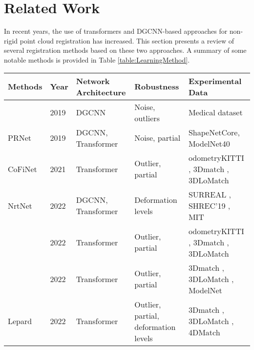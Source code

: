 \section{Related Work}
\label{RelatedWork}
In recent years, the use of transformers and DGCNN-based approaches for non-rigid point cloud registration has increased. This section presents a review of several registration methods based on these two approaches. A summary of some notable methods is provided in Table \ref{table:LearningMethod}.


\begin{table*}
\footnotesize
\centering
\caption{Overview of some learning-based non-rigid point cloud registration methods based on Transformers and DGCNN}
\label{table:LearningMethod}
\begin{tabular}{p{2.25cm} p{1cm} p{2.5cm} p{4cm} p{6cm}} 
\hline
Methods&Year& \raggedright Network Architecture & Robustness & Experimental Data \\
\hline

\citep{hansen2019learning}&2019& DGCNN & Noise, outliers & Medical dataset \\
\hline


PRNet \citep{wang2019prnet}&2019 & \raggedright DGCNN, Transformer  & Noise, partial & ShapeNetCore\citep{chang2015shapenet}, ModelNet40 \citep{wu20153d}  \\
\hline

CoFiNet \cite{yu2021cofinet}&2021& Transformer& Outlier, partial & odometryKITTI \cite{geiger2013vision}, 3Dmatch \cite{zeng20173dmatch}, 3DLoMatch \cite{huang2021predator}\\\hline

NrtNet \citep{hu2022nrtnet}&2022  &  \raggedright DGCNN, Transformer & Deformation levels & SURREAL \citep{varol2017learning}, SHREC’19 \citep{melzi2019shrec}, MIT \citep{grosse2009ground}\\
\hline

\cite{qin2022geometric}&2022&Transformer&Outlier, partial&odometryKITTI \cite{geiger2013vision}, 3Dmatch \cite{zeng20173dmatch}, 3DLoMatch \cite{huang2021predator}\\\hline

\cite{yew2022regtr} &2022&Transformer&Outlier, partial&3Dmatch \cite{zeng20173dmatch}, 3DLoMatch \cite{huang2021predator}, ModelNet \cite{wu20153d}\\\hline
Lepard \cite{li2022lepard} &2022&Transformer&Outlier, partial, deformation levels&3Dmatch \cite{zeng20173dmatch}, 3DLoMatch \cite{huang2021predator}, 4DMatch \cite{li2022lepard} \\\hline


\end{tabular}
\end{table*}
